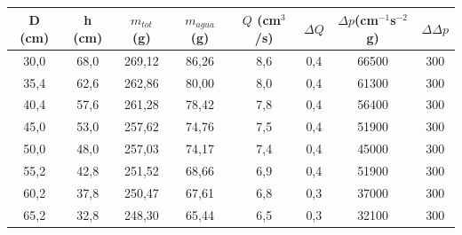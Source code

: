 \documentclass[a4paper,12pt,spanish]{article}
\begin{document}
	
	\begin{table}[H]
		\centering
		\begin{tabular}{cccccccc}
			\hline
			\multicolumn{1}{|c|}{D (cm)} & \multicolumn{1}{c|}{h (cm)} & \multicolumn{1}{c|}{$m_{tot}$ (g)} & \multicolumn{1}{c|}{$m_{agua}$  (g)} & \multicolumn{1}{c|}{$Q$ (cm$^3$/s)} & \multicolumn{1}{c|}{$\Delta Q$} & \multicolumn{1}{c|}{$\mathit{\Delta} p$(cm$^{-1}$s$^{-2}$g)} & \multicolumn{1}{c|}{$\Delta \mathit{\Delta}p$} \\ \hline\hline
			\multicolumn{1}{|c|}{30,0} & \multicolumn{1}{c|}{68,0} & \multicolumn{1}{c|}{269,12} & \multicolumn{1}{c|}{86,26} & \multicolumn{1}{c|}{8,6} & \multicolumn{1}{c|}{0,4} & \multicolumn{1}{c|}{66500} & \multicolumn{1}{c|}{300} \\ \hline
			\multicolumn{1}{|c|}{35,4} & \multicolumn{1}{c|}{62,6} & \multicolumn{1}{c|}{262,86} & \multicolumn{1}{c|}{80,00} & \multicolumn{1}{c|}{8,0} & \multicolumn{1}{c|}{0,4} & \multicolumn{1}{c|}{61300} & \multicolumn{1}{c|}{300} \\ \hline
			\multicolumn{1}{|c|}{40,4} & \multicolumn{1}{c|}{57,6} & \multicolumn{1}{c|}{261,28} & \multicolumn{1}{c|}{78,42} & \multicolumn{1}{c|}{7,8} & \multicolumn{1}{c|}{0,4} & \multicolumn{1}{c|}{56400} & \multicolumn{1}{c|}{300} \\ \hline
			\multicolumn{1}{|c|}{45,0} & \multicolumn{1}{c|}{53,0} & \multicolumn{1}{c|}{257,62} & \multicolumn{1}{c|}{74,76} & \multicolumn{1}{c|}{7,5} & \multicolumn{1}{c|}{0,4} & \multicolumn{1}{c|}{51900} & \multicolumn{1}{c|}{300} \\ \hline
			\multicolumn{1}{|c|}{50,0} & \multicolumn{1}{c|}{48,0} & \multicolumn{1}{c|}{257,03} & \multicolumn{1}{c|}{74,17} & \multicolumn{1}{c|}{7,4} & \multicolumn{1}{c|}{0,4} & \multicolumn{1}{c|}{45000} & \multicolumn{1}{c|}{300} \\ \hline
			\multicolumn{1}{|c|}{55,2} & \multicolumn{1}{c|}{42,8} & \multicolumn{1}{c|}{251,52} & \multicolumn{1}{c|}{68,66} & \multicolumn{1}{c|}{6,9} & \multicolumn{1}{c|}{0,4} & \multicolumn{1}{c|}{51900} & \multicolumn{1}{c|}{300} \\ \hline
			\multicolumn{1}{|c|}{60,2} & \multicolumn{1}{c|}{37,8} & \multicolumn{1}{c|}{250,47} & \multicolumn{1}{c|}{67,61} & \multicolumn{1}{c|}{6,8} & \multicolumn{1}{c|}{0,3} & \multicolumn{1}{c|}{37000} & \multicolumn{1}{c|}{300} \\ \hline
			\multicolumn{1}{|c|}{65,2} & \multicolumn{1}{c|}{32,8} & \multicolumn{1}{c|}{248,30} & \multicolumn{1}{c|}{65,44} & \multicolumn{1}{c|}{6,5} & \multicolumn{1}{c|}{0,3} & \multicolumn{1}{c|}{32100} & \multicolumn{1}{c|}{300} \\ \hline

\end{tabular}
\end{table}
\end{document}
